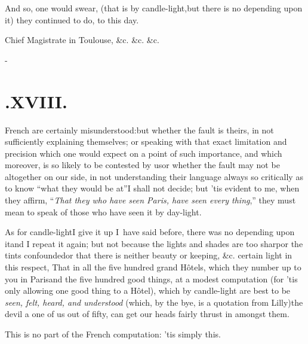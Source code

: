 \documentclass{article}
\begin{document}
\tsk And so, one would swear, (that is by candle-light,\tsk but there is no depending
upon it) they continued to do, to this day.

\bgroup\footnotesize\indent\fnast\enspace
Chief Magistrate in Toulouse, \&c. \&c. \&c.\par\egroup

\vfill{}\eject
\null\kern-\baselineskip
\section{.\enspace XVIII.}

 French are certainly misunderstood:\tsh but whether the fault is theirs,
in not sufficiently explaining themselves; or speaking with that exact limitation
and precision which one would expect on a point of such importance, and which
moreover, is so likely to be contested by us\tsh or whether the fault may not be
altogether on our side, in not understanding their language always so critically as
to know “what they would be at”\tsh I shall not decide; but ’tis evident to me, when
they affirm, “\textit{That they who have seen Paris, have seen every thing},” they
must mean to speak of those who have seen it by day-light.

As for candle-light\tsk I give it up\tsh{} I~have said
before, there was no depending upon it\tsk and I repeat it again;
but not because the lights and shades are too sharp\tsk or the
tints confounded\tsk or that there is neither beauty or keeping,
\&c.\break
{}
certain light in this respect, That in all the five
hundred grand Hôtels, which they number up to you in
Paris\tsk and the five hundred good things, at a modest
computation (for ’tis only allowing one good thing to a
Hôtel), which by candle-light are best to be \textit{seen, felt,
heard, and understood} (which, by the bye, is a quotation
from Lilly)\tsh the devil a one of us out of fifty,
can get our heads fairly thrust in amongst them.

This is no part of the French computation: ’tis
simply this.
\end{document}
